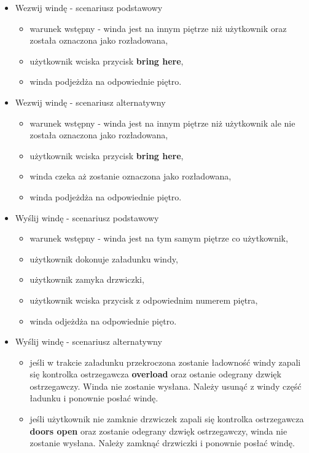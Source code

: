 \documentclass[a4paper,11pt]{article}
\begin{document}
	\begin{itemize}
		\item Wezwij windę - scenariusz podstawowy
		\begin{itemize}
			\item warunek wstępny - winda jest na innym piętrze niż użytkownik oraz została oznaczona jako rozładowana,
			\item użytkownik wciska przycisk \textbf{bring here},
			\item winda podjeżdża na odpowiednie piętro.
		\end{itemize}
		\item Wezwij windę - scenariusz alternatywny
		\begin{itemize}
			\item warunek wstępny - winda jest na innym piętrze niż użytkownik ale nie została oznaczona jako rozładowana,
			\item użytkownik wciska przycisk \textbf{bring here},
			\item winda czeka aż zostanie oznaczona jako rozładowana,
			\item winda podjeżdża na odpowiednie piętro.
		\end{itemize}
		\item Wyślij windę - scenariusz podstawowy
		\begin{itemize}
			\item warunek wstępny - winda jest na tym samym piętrze co użytkownik,
			\item użytkownik dokonuje załadunku windy,
			\item użytkownik zamyka drzwiczki,
			\item użytkownik wciska przycisk z odpowiednim numerem piętra,
			\item winda odjeżdża na odpowiednie piętro.
		\end{itemize}
		\item Wyślij windę - scenariusz alternatywny			
		\begin{itemize}
			\item jeśli w trakcie załadunku przekroczona zostanie ładowność windy zapali się kontrolka ostrzegawcza
			\textbf {overload} oraz ostanie odegrany dzwięk ostrzegawczy.
			Winda nie zostanie wysłana.
			Należy usunąć z windy część ładunku i ponownie posłać windę.
			\item jeśli użytkownik nie zamknie drzwiczek zapali się kontrolka ostrzegawcza \textbf{doors open}
			oraz zostanie odegrany dzwięk ostrzegawczy, winda nie zostanie wysłana.
			Należy zamknąć drzwiczki i ponownie posłać windę.

\end{itemize}
\end{itemize}
\end{document}

